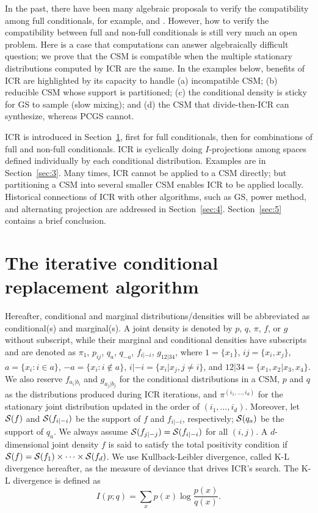 \documentclass[12pt,a4paper]{article}
\begin{document}
In the past, there have been many algebraic proposals to verify the compatibility among full conditionals, for example, \citet{Wang2008} and \citet{Arnold2002}.
However, how to verify the compatibility between full and non-full conditionals is still very much an open problem.
Here is a case that computations can answer  algebraically difficult question;
we prove that the CSM is compatible when the multiple stationary distributions computed by ICR are the same.
In the examples below, benefits of ICR are highlighted by its capacity to handle (a) incompatible CSM; (b) reducible CSM whose support is partitioned; (c) the conditional density is sticky for GS to sample (slow mixing); and (d) the CSM that divide-then-ICR can synthesize, whereas PCGS cannot.

ICR is introduced in Section~\ref{sec:2}, first for full conditionals, then for combinations of full and non-full conditionals.  ICR is cyclically doing $I$-projections  among spaces defined individually  by  each conditional distribution.
Examples are in Section~\ref{sec:3}. Many times, ICR cannot be applied to a CSM directly;  but
partitioning a CSM into several smaller CSM enables ICR to be applied locally. %
Historical connections of ICR with other algorithms,
such as GS, power method, and alternating projection
are addressed in Section~\ref{sec:4}. Section~\ref{sec:5} contains a brief conclusion.

\section{The iterative conditional replacement algorithm}\label{sec:2}
Hereafter, conditional and marginal distributions/densities will be abbreviated as conditional(s) and marginal(s).
A joint density is denoted by $p$, $q$, $\pi$, $f$, or $g$ without subscript, while their marginal and conditional densities have subscripts and are denoted as
$\pi_1$, $p_{ij}$, $q_a$, $q_{-a}$, $f_{i|-i}$, $g_{12|34}$,
where $1=\{x_1\}$, $ij=\{x_i,x_j\}$, $a=\{x_i: i\in a\}$, $-a=\{x_i: i \not \in a\}$, $i|-i=\{x_i|x_j, j\ne i\}$, and $12|34 =\{x_1,x_2|x_3,x_4\}$.
We also reserve $f_{a_i|b_i}$ and $g_{a_j|b_j}$ for the conditional distributions in a CSM,
$p$ and $q$ as the distributions produced during ICR iterations,
and $\pi^{(i_1,\ldots,i_d)}$ for the stationary joint distribution updated in the order of $(i_1,\ldots,i_d)$.
Moreover, let ${\cal S}(f)$ and ${\cal S}(f_{i|-i})$ be the support of $f$ and $f_{i|-i}$, respectively; ${\cal S}(q_a)$ be the support of $q_a$.  We always assume ${\cal S}(f_{j|-j}) = {\cal S}(f_{i|-i})$ for all $(i,j)$.  A $d$-dimensional joint density $f$ is said to satisfy the total positivity condition if ${\cal S}(f)= {\cal S}(f_1)\times \cdots\times {\cal S}(f_d)$.
We use Kullback-Leibler divergence, called K-L divergence hereafter, as the measure of deviance that drives ICR's search.  The K-L divergence is defined as
\[ I(p;q)=\sum_x p(x) \log \frac{p(x)}{q(x)}.\]
\end{document}
